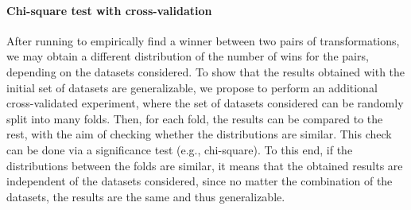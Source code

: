 \paragraph{Chi-square test with cross-validation}
\label{sec:learned-rules-validation}
After running  to empirically find a winner between two pairs of transformations, we may obtain a different distribution of the number of wins for the pairs, depending on the datasets considered.
To show that the results obtained with the initial set of datasets are generalizable, we propose to perform an additional cross-validated experiment, where the set of datasets considered can be randomly split into many folds.
Then, for each fold, the results can be compared to the rest, with the aim of checking whether the distributions are similar.
This check can be done via a significance test (e.g., chi-square).
To this end, if the distributions between the folds are similar, it means that the obtained results are independent of the datasets considered, since no matter the combination of the datasets, the results are the same and thus generalizable.

